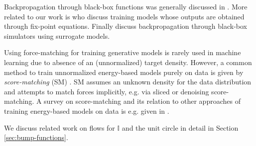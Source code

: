 \documentclass{article}
\begin{document}
Backpropagation through black-box functions was generally discussed in \cite{grathwohl2017backpropagation}. More related to our work is \citet{bai2019deep} who discuss training models whose outputs are obtained through fix-point equations. Finally \citet{shirobokov2020black} discuss backpropagation through black-box simulators using surrogate models.

Using force-matching for training generative models is rarely used in machine learning due to absence of an (unnormalized) target density. However, a common method to train unnormalized energy-based models purely on data is given by \emph{score-matching} (SM) \cite{hyvarinen2005estimation, song2019generative}. SM assumes an unknown density for the data distribution and attempts to match forces implicitly, e.g. via sliced \cite{song2020sliced} or denoising \cite{vincent2011denoising} score-matching. A survey on score-matching and its relation to other approaches of training energy-based models on data is e.g. given in \citet{song2021score}.

We discuss related work on flows for $\mathbb{I}$ and the unit circle in detail in  Section \ref{sec:bump-functions}.
\end{document}
